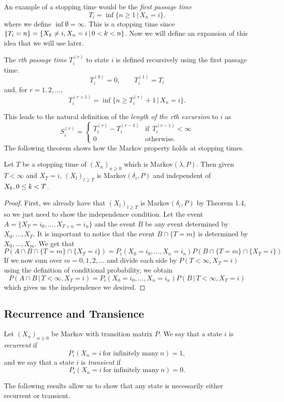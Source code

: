 An example of a stopping time would be the \emph{first passage time}
\[ T_i = \inf \{n \geq 1 \, | \, X_n=i\}.\]
where we define $\inf \emptyset = \infty$. This is a stopping time since $\{T_i = n\} = \{ X_k \neq i , \\X_n=i \, | \, 0 < k < n\}$. Now we will define an expansion of this idea that we will use later.
\begin{defn} The \emph{rth passage time} $T_i^{(r)}$ to state $i$ is defined recursively using the first passage time.
\[T_i^{(0)}=0, \qquad T_i^{(1)}=T_i \]
and, for $r=1,2,\ldots$,
\[T_i^{(r+1)}=\inf\{n\geq T_i^{(r)}+1\,|\,X_n=i\}.\]
\end{defn}
This leads to the natural definition of the \emph{length of the rth excursion} to $i$ as
\[ S_i^{(r)}= \left\{ \begin{array}{ll}
T_i^{(r)}-T_i^{(r-1)} & \textrm{if}\:\:T_i^{(r-1)}<\infty\\
0 & \textrm{otherwise.}
\end{array} \right. \]
The following theorem shows how the Markov property holds at stopping times.

\begin{thm} Let $T$ be a stopping time of $(X_n)_{n \geq 0}$ which is Markov$(\lambda,P)$. Then given $T < \infty$ and $X_T=i$, $(X_l)_{l \geq T}$ is Markov$(\delta_i,P)$ and independent of $X_k, \\0 \leq k < T$.
\end{thm}
\begin{proof} First, we already have that $(X_l)_{l \geq T}$ is Markov$(\delta_i,P)$ by Theorem 1.4, so we just need to show the independence condition. Let the event $A=\{X_T=i_0, \ldots, X_{T+n}=i_n\}$ and the event $B$ be any event determined by $X_0, \ldots, X_T$. It is important to notice that the event $B \cap \{T=m\}$ is determined by $X_0, \ldots, X_m$. We get that
\[P(A \cap B \cap \{T=m\} \cap \{X_T=i\})= P_i(X_0=i_0, \ldots, X_n=i_n)P(B \cap \{T=m\} \cap \{X_T=i\})\]
If we now sum over $m=0,1,2,\ldots$ and divide each side by $P(T<\infty,X_T=i)$ using the definition of conditional probability, we obtain
\[P(A\cap B \,|\,T<\infty,X_T=i)=P_i(X_0=i_0, \ldots, X_n=i_n)P(B\,|\,T<\infty,X_T=i)\]
which gives us the independence we desired.
\end{proof}

\subsection{Recurrence and Transience}
\begin{defn} Let $(X_n)_{n \geq 0}$ be Markov with transition matrix $P$. We say that a state $i$ is \emph{recurrent} if
\[P_i(X_n = i\: \textrm{for infinitely many}\: n)=1,\]
and we say that a state $i$ is \emph{transient} if
\[P_i(X_n = i\: \textrm{for infinitely many}\: n)=0.\]
\end{defn}
The following results allow us to show that any state is necessarily either recurrent or transient.

